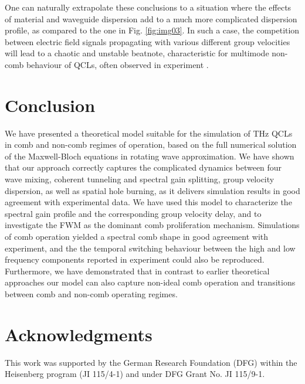 \documentclass[10pt,letterpaper]{article}%
\begin{document}
One can naturally extrapolate these conclusions to a situation where the
effects of material and waveguide dispersion add to a much more complicated
dispersion profile, as compared to the one in Fig. \ref{fig:img03}. In such a
case, the competition between electric field signals propagating with various
different group velocities will lead to a chaotic and unstable beatnote,
characteristic for multimode non-comb behaviour of QCLs, often observed in
experiment \cite{burghoff2014terahertz,wienold2014evidence,rosch2015octave}.

\section{Conclusion}

We have presented a theoretical model suitable for the simulation of THz QCLs
in comb and non-comb regimes of operation, based on the full numerical
solution of the Maxwell-Bloch equations in rotating wave approximation. We
have shown that our approach correctly captures the complicated dynamics
between four wave mixing, coherent tunneling and spectral gain splitting,
group velocity dispersion, as well as spatial hole burning, as it delivers
simulation results in good agreement with experimental data. We have used this
model to characterize the spectral gain profile and the corresponding group
velocity delay, and to investigate the FWM as the dominant comb proliferation
mechanism. Simulations of comb operation yielded a spectral comb shape in good
agreement with experiment, and the the temporal switching behaviour between
the high and low frequency components reported in experiment could also be
reproduced. Furthermore, we have demonstrated that in contrast to earlier theoretical approaches our model can also capture non-ideal comb operation and transitions between comb and
non-comb operating regimes.

\section*{Acknowledgments}
This work was supported by the German Research Foundation (DFG) within the
Heisenberg program (JI 115/4-1) and under DFG Grant No. JI 115/9-1.
\end{document}
